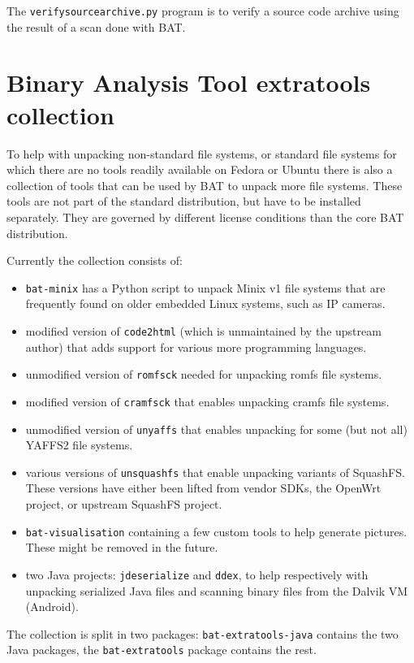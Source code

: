 \documentclass[10pt]{article}
\begin{document}
The \texttt{verifysourcearchive.py} program is to verify a source code archive
using the result of a scan done with BAT.

\section{Binary Analysis Tool extratools collection}

To help with unpacking non-standard file systems, or standard file systems for
which there are no tools readily available on Fedora or Ubuntu there is also
a collection of tools that can be used by BAT to unpack more file systems.
These tools are not part of the standard distribution, but have to be installed
separately. They are governed by different license conditions than the core BAT
distribution.

Currently the collection consists of:

\begin{itemize}
\item \texttt{bat-minix} has a Python script to unpack Minix v1 file systems
that are frequently found on older embedded Linux systems, such as IP cameras.
\item modified version of \texttt{code2html} (which is unmaintained by the
upstream author) that adds support for various more programming languages.
\item unmodified version of \texttt{romfsck} needed for unpacking romfs file
systems.
\item modified version of \texttt{cramfsck} that enables unpacking cramfs
file systems.
\item unmodified version of \texttt{unyaffs} that enables unpacking for some
(but not all) YAFFS2 file systems.
\item various versions of \texttt{unsquashfs} that enable unpacking variants
of SquashFS. These versions have either been lifted from vendor SDKs, the
OpenWrt project, or upstream SquashFS project.
\item \texttt{bat-visualisation} containing a few custom tools to help generate
pictures. These might be removed in the future.
\item two Java projects: \texttt{jdeserialize} and \texttt{ddex}, to help
respectively with unpacking serialized Java files and scanning binary files
from the Dalvik VM (Android).
\end{itemize}

The collection is split in two packages: \texttt{bat-extratools-java} contains
the two Java packages, the \texttt{bat-extratools} package contains the rest.
\end{document}

